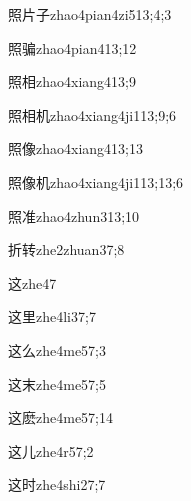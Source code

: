 \begin{verbete}{照片子}{zhao4pian4zi5}{13;4;3}
\end{verbete}
\begin{verbete}{照骗}{zhao4pian4}{13;12}
\end{verbete}
\begin{verbete}{照相}{zhao4xiang4}{13;9}
\end{verbete}
\begin{verbete}{照相机}{zhao4xiang4ji1}{13;9;6}
\end{verbete}
\begin{verbete}{照像}{zhao4xiang4}{13;13}
\end{verbete}
\begin{verbete}{照像机}{zhao4xiang4ji1}{13;13;6}
\end{verbete}
\begin{verbete}{照准}{zhao4zhun3}{13;10}
\end{verbete}
\begin{verbete}{折转}{zhe2zhuan3}{7;8}
\end{verbete}
\begin{verbete}{这}{zhe4}{7}
\end{verbete}
\begin{verbete}{这里}{zhe4li3}{7;7}
\end{verbete}
\begin{verbete}{这么}{zhe4me5}{7;3}
\end{verbete}
\begin{verbete}{这末}{zhe4me5}{7;5}
\end{verbete}
\begin{verbete}{这麽}{zhe4me5}{7;14}
\end{verbete}
\begin{verbete}{这儿}{zhe4r5}{7;2}
\end{verbete}
\begin{verbete}{这时}{zhe4shi2}{7;7}
\end{verbete}
